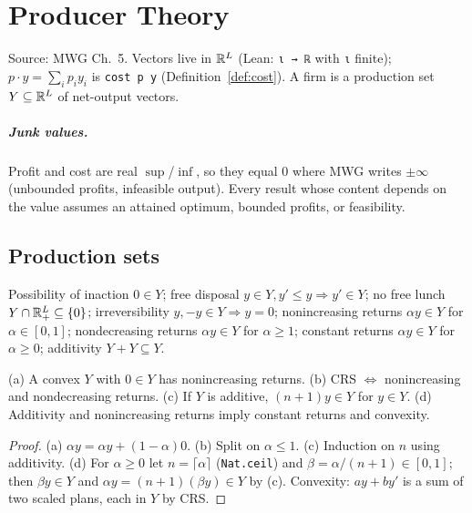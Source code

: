 \chapter{Producer Theory}
\label{chap:producer}

Source: MWG Ch.~5. Vectors live in $\mathbb{R}^L$ (Lean: \texttt{ι → ℝ} with \texttt{ι} finite);
$p \cdot y = \sum_i p_i y_i$ is \texttt{cost p y} (Definition~\ref{def:cost}). A firm is a
production set $Y \subseteq \mathbb{R}^L$ of net-output vectors.

\paragraph{Junk values.} Profit and cost are real $\sup$/$\inf$, so they equal $0$ where MWG
writes $\pm\infty$ (unbounded profits, infeasible output). Every result whose content depends on
the value assumes an attained optimum, bounded profits, or feasibility.

\section{Production sets}
\label{sec:production-sets}

\begin{definition}
\label{def:production-properties}
\leanok
Possibility of inaction $0 \in Y$; free disposal $y \in Y, y' \le y \Rightarrow y' \in Y$;
no free lunch $Y \cap \mathbb{R}^L_+ \subseteq \{0\}$; irreversibility $y, -y \in Y \Rightarrow y = 0$;
nonincreasing returns $\alpha y \in Y$ for $\alpha \in [0,1]$; nondecreasing returns
$\alpha y \in Y$ for $\alpha \ge 1$; constant returns $\alpha y \in Y$ for $\alpha \ge 0$;
additivity $Y + Y \subseteq Y$.
\end{definition}

\begin{proposition}
\label{prop:production-relations}
\leanok
{}
(a) A convex $Y$ with $0 \in Y$ has nonincreasing returns. (b) CRS $\iff$ nonincreasing and
nondecreasing returns. (c) If $Y$ is additive, $(n+1) y \in Y$ for $y \in Y$. (d) Additivity and
nonincreasing returns imply constant returns and convexity.
\end{proposition}
\begin{proof}
\leanok
(a) $\alpha y = \alpha y + (1-\alpha) 0$. (b) Split on $\alpha \le 1$. (c) Induction on $n$ using
additivity. (d) For $\alpha \ge 0$ let $n = \lceil \alpha \rceil$ (\texttt{Nat.ceil}) and
$\beta = \alpha/(n+1) \in [0,1]$; then $\beta y \in Y$ and $\alpha y = (n+1)(\beta y) \in Y$ by (c).
Convexity: $a y + b y'$ is a sum of two scaled plans, each in $Y$ by CRS.
\end{proof}

